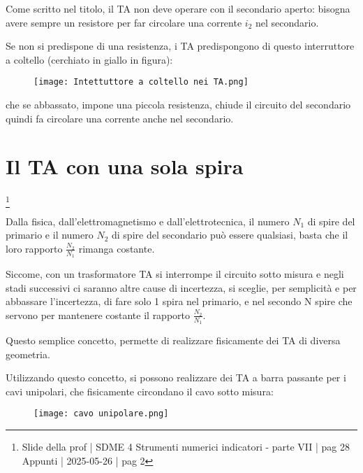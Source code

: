 Come scritto nel titolo, il TA non deve operare con il secondario aperto: 
bisogna avere sempre un resistore per far circolare una corrente $i_2$ nel secondario. \newline 

Se non si predispone di una resistenza, i TA predispongono di questo interruttore a coltello (cerchiato in giallo in figura): 

\begin{figure}[h]
    \centering
    \texttt{[image: Intettuttore a coltello nei TA.png]}
\end{figure}

che se abbassato, impone una piccola resistenza, chiude il circuito del secondario quindi fa circolare una corrente anche nel secondario. \newline  

\newpage 

\section{Il TA con una sola spira}
\footnote{Slide della prof | SDME 4 Strumenti numerici indicatori - parte VII | pag 28\\  
Appunti | 2025-05-26 | pag 2} 

Dalla fisica, dall'elettromagnetismo e dall'elettrotecnica, il numero $N_1$ di spire del primario e il numero $N_2$ di spire del secondario può essere qualsiasi, 
basta che il loro rapporto $\frac{N_2}{N_1}$ rimanga costante. \newline 

Siccome, con un trasformatore TA si interrompe il circuito sotto misura e negli stadi successivi ci saranno altre cause di incertezza, 
si sceglie, per semplicità e per abbassare l'incertezza, di fare solo 1 spira nel primario, e nel secondo N spire che servono per mantenere costante il rapporto $\frac{N_2}{N_1}$. \newline 

Questo semplice concetto, permette di realizzare fisicamente dei TA di diversa geometria. \newline 

Utilizzando questo concetto, si possono realizzare dei TA a barra passante per i cavi unipolari, che fisicamente circondano il cavo sotto misura: 

\begin{figure}[h]
    \centering
    \texttt{[image: cavo unipolare.png]}
\end{figure}

